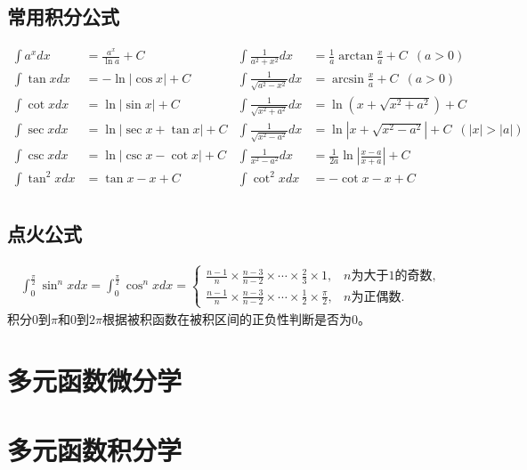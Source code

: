 ﻿\documentclass[a4paper,12pt,UTF8]{ctexart}
\begin{document}
    \subsection{常用积分公式}
    \begin{align*}
        \int {a}^{x} dx& = \frac{{a}^{x}}{\ln a}+C& \int \frac{1}{a^{2}+x^{2}}dx& = \frac{1}{a}\arctan\frac{x}{a}+C \enspace (a>0)&\\
        \int \tan x dx& = -\ln \left|\cos x \right|+C& \int \frac{1}{\sqrt{a^{2}-x^{2}}}dx& = \arcsin\frac{x}{a}+C \enspace (a>0)&\\
        \int \cot x dx& = \ln \left|\sin x \right|+C& \int \frac{1}{\sqrt{x^{2}+a^{2}}}dx& = \ln\left(x+\sqrt{x^{2}+a^{2}}\right)+C&\\
        \int \sec x dx& = \ln \left|\sec x + \tan x \right|+C& \int \frac{1}{\sqrt{x^{2}-a^{2}}}dx& = \ln\left|x+\sqrt{x^{2}-a^{2}}\right|+C \enspace (\left|x\right|>\left|a\right|)&\\
        \int \csc x dx& = \ln \left|\csc x - \cot x \right|+C& \int \frac{1}{x^{2}-a^{2}}dx& = \frac{1}{2a}\ln\left|\frac{x-a}{x+a}\right|+C&\\
        \int \tan^2 x dx& = \tan x-x+C& \int \cot^2 x dx& = -\cot x-x+C& \\
    \end{align*}
    
    \subsection{点火公式}
    \begin{align*}
        \int_{0}^{\frac{\pi}{2}} \sin^{n}x dx = \int_{0}^{\frac{\pi}{2}} \cos^{n}x dx =
        \begin{cases}
            \frac{n-1}{n} \times \frac{n-3}{n-2} \times \cdots \times \frac{2}{3} \times 1,& n \text{为大于} 1 \text{的奇数},\\
            \frac{n-1}{n} \times \frac{n-3}{n-2} \times \cdots \times \frac{1}{2} \times \frac{\pi}{2},& n \text{为正偶数}.
        \end{cases}
    \end{align*}
    积分0到\(\pi\)和0到\(2\pi\)根据被积函数在被积区间的正负性判断是否为0。

    \section{多元函数微分学}

    \section{多元函数积分学}
\end{document}
